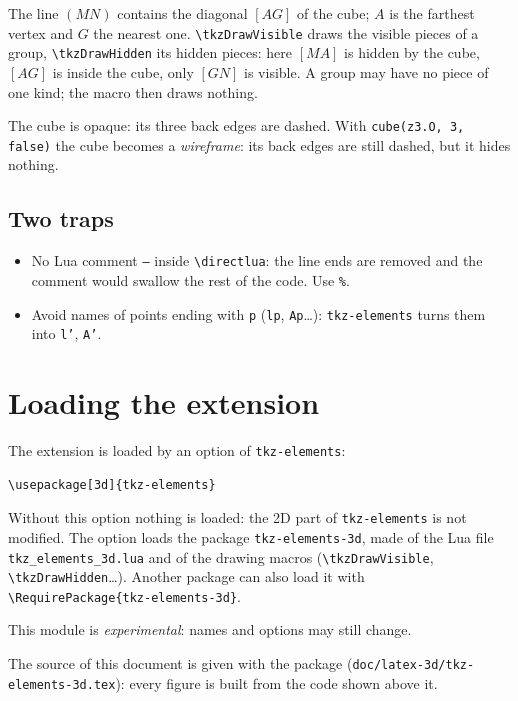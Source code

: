 \documentclass[11pt]{article}
\newcommand\code[1]{\texttt{#1}}
\newcommand\bs{\textbackslash}
\begin{document}
The line $(MN)$ contains the diagonal $[AG]$ of the cube; $A$ is the farthest
vertex and $G$ the nearest one. \code{\bs tkzDrawVisible} draws the visible
pieces of a group, \code{\bs tkzDrawHidden} its hidden pieces: here $[MA]$ is
hidden by the cube, $[AG]$ is inside the cube, only $[GN]$ is visible. A group
may have no piece of one kind; the macro then draws nothing.

The cube is opaque: its three back edges are dashed. With \code{cube(z3.O, 3, false)} the cube becomes a
\emph{wireframe}: its back edges are still dashed, but it hides nothing.

\subsection{Two traps}

\begin{itemize}
  \item No Lua comment \code{--} inside \code{\bs directlua}: the line ends are
        removed and the comment would swallow the rest of the code. Use
        \code{\%}.
  \item Avoid names of points ending with \code{p} (\code{lp}, \code{Ap}\ldots):
        \code{tkz-elements} turns them into \code{l'}, \code{A'}.
\end{itemize}

\section{Loading the extension}

The extension is loaded by an option of \code{tkz-elements}:
\begin{Verbatim}[fontsize=\small]
\usepackage[3d]{tkz-elements}
\end{Verbatim}
Without this option nothing is loaded: the 2D part of \code{tkz-elements} is
not modified. The option loads the package \code{tkz-elements-3d}, made of
the Lua file \code{tkz\_elements\_3d.lua} and of the drawing macros
(\code{\bs tkzDrawVisible}, \code{\bs tkzDrawHidden}\ldots). Another package
can also load it with \code{\bs RequirePackage\{tkz-elements-3d\}}.

This module is \emph{experimental}: names and options may still change.

The source of this document is given with the package
(\code{doc/latex-3d/tkz-elements-3d.tex}): every figure is built from the code
shown above it.
\end{document}
